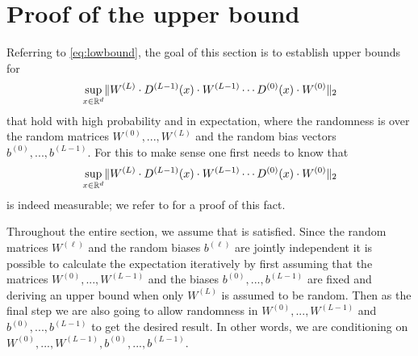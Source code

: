 
\section{Proof of the upper bound} \label{sec:upper}

Referring to \eqref{eq:lowbound}, the goal of this section is to establish upper bounds for
\begin{equation*}
\underset{x \in \mathbb{R}^d}{\sup}\Vert W^{(L)} \cdot D^{(L-1)}(x) \cdot W^{(L-1)} \cdots D^{(0)}(x)\cdot W^{(0)}\Vert_2
\end{equation*}
that hold with high probability and in expectation, where the randomness is over the random matrices $W^{(0)} , ..., W^{(L)}$ and the random bias vectors $b^{(0)}, ..., b^{(L-1)}$. For this to make sense one first needs to know that 
\begin{equation} \label{eq:suppp}
\underset{x \in \mathbb{R}^d}{\sup}\Vert W^{(L)} \cdot D^{(L-1)}(x) \cdot W^{(L-1)}\cdots D^{(0)}(x)\cdot W^{(0)}\Vert_2
\end{equation} 
is indeed measurable; we refer to  for a proof of this fact. 

Throughout the entire section, we assume that  is satisfied. 
Since the random matrices $W^{(\ell)}$ and the random biases $b^{(\ell)}$ are jointly independent it is possible to calculate the expectation iteratively by first assuming that the matrices
 $W^{(0)}, ... ,W^{(L-1)}$ and the biases $b^{(0)}, ..., b^{(L-1)}$ are fixed and deriving an upper bound when only $W^{(L)}$ is assumed to be random. Then as the final step we are also going to allow randomness in $W^{(0)}, ..., W^{(L-1)}$ and $b^{(0)}, ..., b^{(L-1)}$ to get the desired result. In other words, we are conditioning on $W^{(0)}, ..., W^{(L-1)}, b^{(0)}, ..., b^{(L-1)}$.

